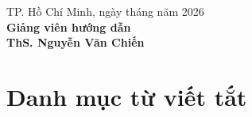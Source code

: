 \documentclass[14pt,a4paper,oneside]{extreport}
\newcommand{\instructorname}{
    ThS. Nguyễn Văn Chiến
}
\begin{document}
\vfill

\begin{flushright}
    TP. Hồ Chí Minh, ngày \hspace{0.5cm}
    tháng \hspace{0.5cm} năm 2026\\[0.5cm]

    \textbf{Giảng viên hướng dẫn}\\[2cm]

    \textbf{\instructorname}
\end{flushright}

\clearpage


\tableofcontents

\clearpage


\listoffigures

\clearpage


\listoftables

\clearpage


\chapter*{Danh mục từ viết tắt}
\end{document}

